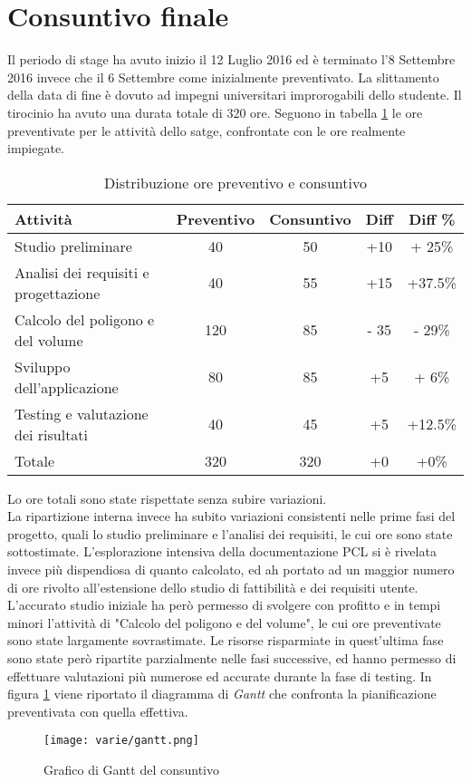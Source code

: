 \section{Consuntivo finale}
Il periodo di stage ha avuto inizio il 12 Luglio 2016 ed è terminato l'8 Settembre 2016 invece che il 6 Settembre come inizialmente preventivato. La slittamento della data di fine è dovuto ad impegni universitari improrogabili  dello studente. Il tirocinio ha avuto una durata totale di 320 ore.
Seguono in tabella \ref{tab:preventivo-consuntivo} le ore preventivate per le attività dello satge, confrontate con le ore realmente impiegate.
\begin{table}[h]
	\begin{center}
	  \begin{tabular}{| l | c | c | c | c |}
	    \hline
	    \textbf{Attività} & \textbf{Preventivo} & \textbf{Consuntivo} & \textbf{Diff} & \textbf{Diff \%} \\ \hline
	    Studio preliminare & 40 & 50 & +10 & + 25\%\\
	    \hline
	    Analisi dei requisiti e progettazione & 40 & 55 & +15 & +37.5\%\\
	    \hline
	    Calcolo del poligono e del volume & 120 & 85 & - 35 & - 29\%\\
	    \hline
	    Sviluppo dell'applicazione & 80 & 85 & +5 &  + 6\%\\
	    \hline
	    Testing e valutazione dei risultati & 40 & 45 & +5 & +12.5\%\\
	    \hline

	    Totale & 320 & 320 & +0 & +0\%\\
	    \hline
	  \end{tabular}
	\end{center}
	\caption{Distribuzione ore preventivo e consuntivo}
	\label{tab:preventivo-consuntivo}
\end{table}
\newline
Lo ore totali sono state rispettate senza subire variazioni.\\
La ripartizione interna invece ha subito variazioni consistenti nelle prime fasi del progetto, quali lo studio preliminare e l'analisi dei requisiti, le cui ore sono state sottostimate. L'esplorazione intensiva della documentazione PCL si è rivelata invece più dispendiosa di quanto calcolato, ed ah portato ad un maggior numero di ore rivolto all'estensione dello studio di fattibilità e dei requisiti utente.\\
 L'accurato studio iniziale ha però permesso di svolgere con profitto e in tempi minori l'attività di "Calcolo del poligono e del volume", le cui ore preventivate sono state largamente sovrastimate. Le risorse risparmiate in quest'ultima fase sono state però ripartite parzialmente nelle fasi successive, ed hanno permesso di effettuare valutazioni più numerose ed accurate durante la fase di testing.
In figura \ref{fig:gantt} viene riportato il diagramma di \emph{Gantt} che confronta la pianificazione preventivata con quella effettiva.
\begin{figure}[!h] 
    \centering 
    \texttt{[image: varie/gantt.png]} 
    \caption{Grafico di Gantt del consuntivo}
   \label{fig:gantt}
\end{figure}


